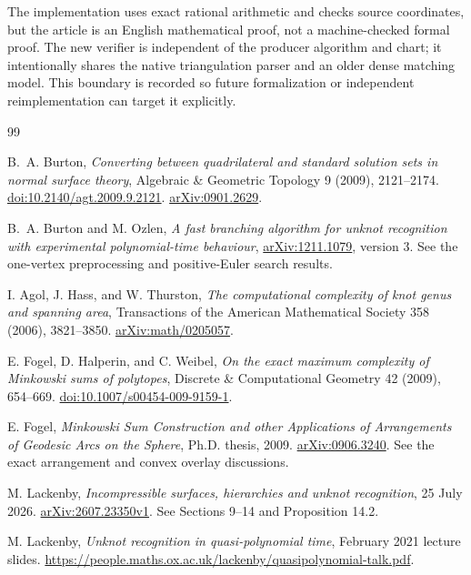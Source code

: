 \documentclass[11pt,letterpaper]{article}
\theoremstyle{definition}
\theoremstyle{remark}\newtheorem{remark}[theorem]{Remark}
\begin{document}
The implementation uses exact rational arithmetic and checks source
coordinates, but the article is an English mathematical proof, not a
machine-checked formal proof. The new verifier is independent of the
producer algorithm and chart; it intentionally shares the native
triangulation parser and an older dense matching model. This boundary
is recorded so future formalization or independent reimplementation can
target it explicitly.

\clearpage
\begin{thebibliography}{99}

B.~A. Burton, \emph{Converting between quadrilateral and standard solution
sets in normal surface theory}, Algebraic \& Geometric Topology 9 (2009),
2121--2174. \href{https://doi.org/10.2140/agt.2009.9.2121}{doi:10.2140/agt.2009.9.2121}.
\href{https://arxiv.org/abs/0901.2629}{arXiv:0901.2629}.

B.~A. Burton and M. Ozlen, \emph{A fast branching algorithm for unknot
recognition with experimental polynomial-time behaviour},
\href{https://arxiv.org/abs/1211.1079}{arXiv:1211.1079}, version 3.
See the one-vertex preprocessing and positive-Euler search results.

I. Agol, J. Hass, and W. Thurston, \emph{The computational complexity of
knot genus and spanning area}, Transactions of the American Mathematical
Society 358 (2006), 3821--3850.
\href{https://arxiv.org/abs/math/0205057}{arXiv:math/0205057}.

E. Fogel, D. Halperin, and C. Weibel, \emph{On the exact maximum complexity
of Minkowski sums of polytopes}, Discrete \& Computational Geometry 42
(2009), 654--669.
\href{https://doi.org/10.1007/s00454-009-9159-1}{doi:10.1007/s00454-009-9159-1}.

E. Fogel, \emph{Minkowski Sum Construction and other Applications of
Arrangements of Geodesic Arcs on the Sphere}, Ph.D. thesis, 2009.
\href{https://arxiv.org/abs/0906.3240}{arXiv:0906.3240}.
See the exact arrangement and convex overlay discussions.

M. Lackenby, \emph{Incompressible surfaces, hierarchies and unknot
recognition}, 25 July 2026.
\href{https://arxiv.org/abs/2607.23350}{arXiv:2607.23350v1}.
See Sections 9--14 and Proposition 14.2.

M. Lackenby, \emph{Unknot recognition in quasi-polynomial time},
February 2021 lecture slides.
\url{https://people.maths.ox.ac.uk/lackenby/quasipolynomial-talk.pdf}.


\end{thebibliography}
\end{document}
